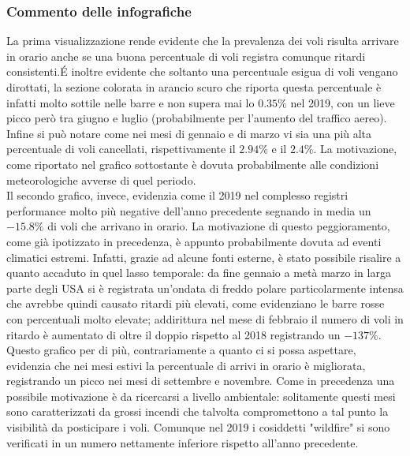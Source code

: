 \documentclass[12pt]{article}
\begin{document}
\subsubsection{Commento delle infografiche}
La prima visualizzazione rende evidente che la prevalenza dei voli risulta arrivare in orario anche se una buona percentuale di voli registra comunque ritardi consistenti.\'E inoltre evidente che soltanto una percentuale esigua di voli vengano dirottati, la sezione colorata in arancio scuro che riporta questa percentuale è infatti molto sottile nelle barre e non supera mai lo $0.35\%$ nel 2019, con un lieve picco però tra giugno e luglio (probabilmente per l'aumento del traffico aereo). Infine si può notare come nei mesi di gennaio e di marzo vi sia una più alta percentuale di voli cancellati, rispettivamente il $2.94\%$ e il $2.4\%$. La motivazione, come riportato nel grafico sottostante è dovuta probabilmente alle condizioni meteorologiche avverse di quel periodo.\\
Il secondo grafico, invece, evidenzia come il 2019 nel complesso registri performance molto più negative dell'anno precedente segnando in media un $-15.8\%$ di voli che arrivano in orario. La motivazione di questo peggioramento, come già ipotizzato in precedenza, è appunto probabilmente dovuta ad eventi climatici estremi. Infatti, grazie ad alcune fonti esterne, è stato possibile risalire a quanto accaduto in quel lasso temporale: da fine gennaio a metà marzo in larga parte degli USA si è registrata un'ondata di freddo polare particolarmente intensa che avrebbe quindi causato ritardi più elevati, come evidenziano le barre rosse con percentuali molto elevate; addirittura nel mese di febbraio il numero di voli in ritardo è aumentato di oltre il doppio rispetto al 2018 registrando un $-137\%$. Questo grafico per di più, contrariamente a quanto ci si possa aspettare, evidenzia che nei mesi estivi la percentuale di arrivi in orario è migliorata, registrando un picco nei mesi di settembre e novembre. Come in precedenza una possibile motivazione è da ricercarsi a livello ambientale: solitamente questi mesi sono caratterizzati da grossi incendi che talvolta compromettono a tal punto la visibilità da posticipare i voli. Comunque nel 2019 i cosiddetti "wildfire" si sono verificati in un numero nettamente inferiore rispetto all'anno precedente. 
\end{document}
